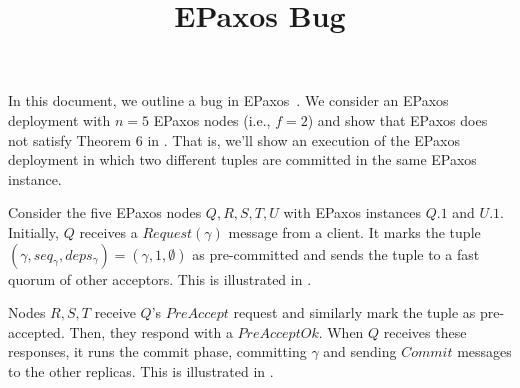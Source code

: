 \documentclass{mwhittaker}
\title{EPaxos Bug}
\newcommand{\instance}[7][top]{{%
  \ifthenelse{\NOT \(
    \equal{#6}{} \OR
    \equal{#6}{pre-accepted} \OR
    \equal{#6}{accepted} \OR
    \equal{#6}{committed}
  \)}{%
    \errmessage{Instance status must be pre-accepted, accepted, or committed.}
  }{}

  \newcommand{\instancecolor}{black}
  \newcommand{\abbreviatedstatus}{}
  \ifthenelse{\equal{#6}{pre-accepted}}{%
    \renewcommand{\instancecolor}{flatblue}
    \renewcommand{\abbreviatedstatus}{pre}
  }{\ifthenelse{\equal{#6}{accepted}}{%
    \renewcommand{\instancecolor}{flatred}
    \renewcommand{\abbreviatedstatus}{acc}
  }{\ifthenelse{\equal{#6}{committed}}{%
    \renewcommand{\instancecolor}{flatgreen}
    \renewcommand{\abbreviatedstatus}{com}
  }{%
  }}}

  \ifthenelse{\equal{#1}{top}}{%
    \newcommand{\instancelabel}{90}
  }{\ifthenelse{\equal{#1}{bottom}}{%
    \newcommand{\instancelabel}{270}
  }{%
    \errmessage{The optional instance argument must be top or bottom, not #1.}
  }}

  \node[
    draw=\instancecolor,
    line width=1pt,
    label={\instancelabel:$#3$},
    minimum height=1.5cm,
    minimum width=1.5cm,
    align=center
  ] (#2) at (#7) {\abbreviatedstatus{}\\$#4$\\$#5$};%
}}
\newcommand{\Qx}{0}
\newcommand{\Rx}{2}
\newcommand{\Sx}{4}
\newcommand{\Tx}{6}
\newcommand{\Ux}{8}
\begin{document}
\maketitle

In this document, we outline a bug in EPaxos~\cite{moraru2013there,
moraru2013proof}. We consider an EPaxos deployment with $n = 5$ EPaxos nodes
(i.e., $f = 2$) and show that EPaxos does not satisfy Theorem $6$ in
\cite{moraru2013proof}. That is, we'll show an execution of the EPaxos
deployment in which two different tuples are committed in the same EPaxos
instance.

Consider the five EPaxos nodes $Q, R, S, T, U$ with EPaxos instances $Q.1$ and
$U.1$. Initially, $Q$ receives a $Request(\gamma)$ message from a client. It
marks the tuple $(\gamma, seq_\gamma, deps_\gamma) = (\gamma, 1, \emptyset)$ as
pre-committed and sends the tuple to a fast quorum of other acceptors. This is
illustrated in .

\begin{figure}[h]
  \centering


  \caption{}
\end{figure}

Nodes $R, S, T$ receive $Q$'s $PreAccept$ request and similarly mark the tuple
as pre-accepted. Then, they respond with a $PreAcceptOk$. When $Q$ receives
these responses, it runs the commit phase, committing $\gamma$ and sending
$Commit$ messages to the other replicas. This is illustrated in
.
\end{document}
